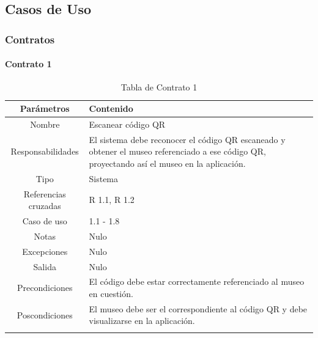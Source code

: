 \subsection{Casos de Uso}

\newpage


\newpage


\newpage


\newpage


\newpage


\newpage


\newpage


\newpage



\subsubsection{Contratos} %

\paragraph{Contrato 1} 
\begin{longtable}{|c|p{7cm}|}
\hline 
Parámetros & Contenido\\ 
\hline
Nombre & Escanear código QR\\ 
\hline
Responsabilidades & El sistema debe reconocer el código QR escaneado y obtener el museo referenciado a ese código QR, proyectando así el museo en la aplicación.\\ 
\hline
Tipo & Sistema\\ 
\hline
Referencias cruzadas & R 1.1, R 1.2\\ 
\hline
Caso de uso & 1.1 - 1.8\\ 
\hline
Notas & Nulo\\ 
\hline
Excepciones & Nulo\\ 
\hline
Salida & Nulo\\ 
\hline
Precondiciones & El código debe estar correctamente referenciado al museo en cuestión.\\ 
\hline
Poscondiciones & El museo debe ser el correspondiente al código QR y debe visualizarse en la aplicación.\\ 
\hline
\caption{Tabla de Contrato 1}
\label{tabCont1}\\
\end{longtable}

